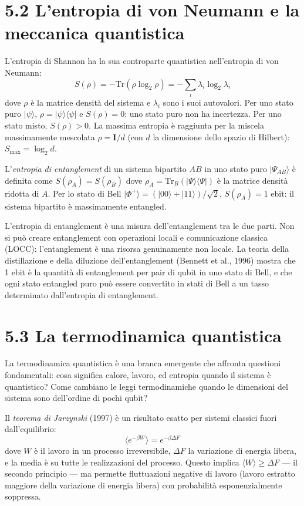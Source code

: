 \documentclass[11.5pt,a4paper,openany]{book}
\theoremstyle{remark}
\begin{document}
\section{5.2 L'entropia di von Neumann e la meccanica quantistica}

L'entropia di Shannon ha la sua controparte quantistica nell'entropia di von Neumann:
\[
S(\rho) = -\text{Tr}(\rho \log_2 \rho) = -\sum_i \lambda_i \log_2 \lambda_i
\]
dove $\rho$ è la matrice densità del sistema e $\lambda_i$ sono i suoi autovalori. Per uno stato puro $|\psi\rangle$, $\rho = |\psi\rangle\langle\psi|$ e $S(\rho) = 0$: uno stato puro non ha incertezza. Per uno stato misto, $S(\rho) > 0$. La massima entropia è raggiunta per la miscela massimamente mescolata $\rho = \mathbf{I}/d$ (con $d$ la dimensione dello spazio di Hilbert): $S_{\max} = \log_2 d$.

L'\textit{entropia di entanglement} di un sistema bipartito $AB$ in uno stato puro $|\Psi_{AB}\rangle$ è definita come $S(\rho_A) = S(\rho_B)$ dove $\rho_A = \text{Tr}_B(|\Psi\rangle\langle\Psi|)$ è la matrice densità ridotta di $A$. Per lo stato di Bell $|\Phi^+\rangle = (|00\rangle + |11\rangle)/\sqrt{2}$, $S(\rho_A) = 1$ ebit: il sistema bipartito è massimamente entangled.

L'entropia di entanglement è una misura dell'entanglement tra le due parti. Non si può creare entanglement con operazioni locali e comunicazione classica (LOCC): l'entanglement è una risorsa genuinamente non locale. La teoria della distillazione e della diluzione dell'entanglement (Bennett et al., 1996) mostra che 1 ebit è la quantità di entanglement per pair di qubit in uno stato di Bell, e che ogni stato entangled puro può essere convertito in stati di Bell a un tasso determinato dall'entropia di entanglement.

\section{5.3 La termodinamica quantistica}

La termodinamica quantistica è una branca emergente che affronta questioni fondamentali: cosa significa calore, lavoro, ed entropia quando il sistema è quantistico? Come cambiano le leggi termodinamiche quando le dimensioni del sistema sono dell'ordine di pochi qubit?

Il \textit{teorema di Jarzynski} (1997) è un risultato esatto per sistemi classici fuori dall'equilibrio:
\[
\langle e^{-\beta W} \rangle = e^{-\beta \Delta F}
\]
dove $W$ è il lavoro in un processo irreversibile, $\Delta F$ la variazione di energia libera, e la media è su tutte le realizzazioni del processo. Questo implica $\langle W \rangle \geq \Delta F$ --- il secondo principio --- ma permette fluttuazioni negative di lavoro (lavoro estratto maggiore della variazione di energia libera) con probabilità esponenzialmente soppressa.
\end{document}
